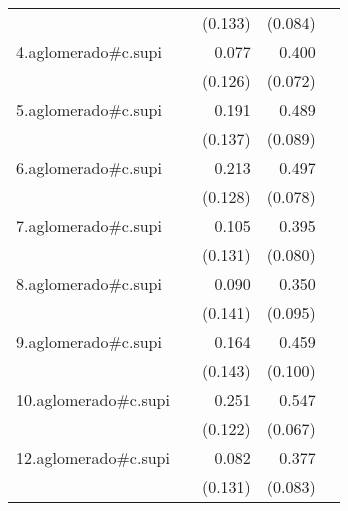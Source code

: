 {\begin{longtable}{l*{4}{D{.}{.}{-1}}}
            &                     &     (0.133)         &     (0.084)         &                     \\
\addlinespace
4.aglomerado#c.supi&                     &       0.077         &       0.400\sym{***}&                     \\
            &                     &     (0.126)         &     (0.072)         &                     \\
\addlinespace
5.aglomerado#c.supi&                     &       0.191         &       0.489\sym{***}&                     \\
            &                     &     (0.137)         &     (0.089)         &                     \\
\addlinespace
6.aglomerado#c.supi&                     &       0.213         &       0.497\sym{***}&                     \\
            &                     &     (0.128)         &     (0.078)         &                     \\
\addlinespace
7.aglomerado#c.supi&                     &       0.105         &       0.395\sym{***}&                     \\
            &                     &     (0.131)         &     (0.080)         &                     \\
\addlinespace
8.aglomerado#c.supi&                     &       0.090         &       0.350\sym{***}&                     \\
            &                     &     (0.141)         &     (0.095)         &                     \\
\addlinespace
9.aglomerado#c.supi&                     &       0.164         &       0.459\sym{***}&                     \\
            &                     &     (0.143)         &     (0.100)         &                     \\
\addlinespace
10.aglomerado#c.supi&                     &       0.251\sym{*}  &       0.547\sym{***}&                     \\
            &                     &     (0.122)         &     (0.067)         &                     \\
\addlinespace
12.aglomerado#c.supi&                     &       0.082         &       0.377\sym{***}&                     \\
            &                     &     (0.131)         &     (0.083)         &                     \\

\end{longtable}}
